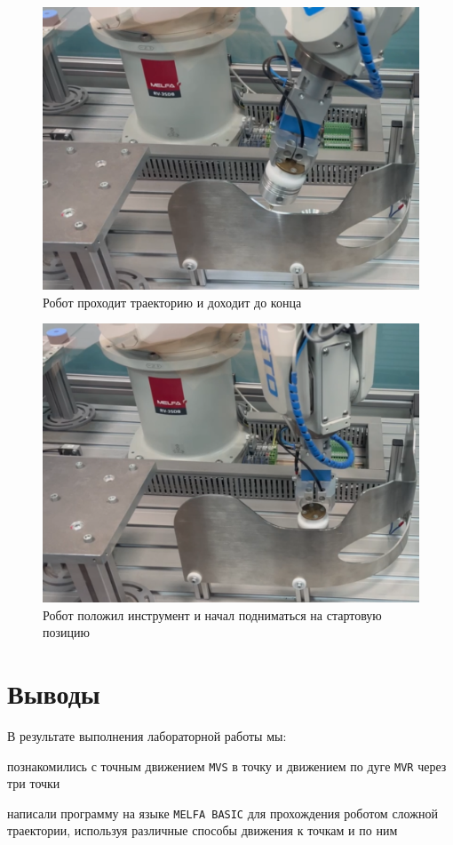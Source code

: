 \documentclass[a4paper, 12pt]{article}
\begin{document}
    \begin{figure}[H]
        \centering
        \includegraphics[scale=0.55]{scr3.png}
        \captionsetup{skip=0pt}
        \caption{Робот проходит траекторию и доходит до конца}
        \label{fig:scr3}
    \end{figure}
    \begin{figure}[H]
        \centering
        \includegraphics[scale=0.55]{end.png}
        \captionsetup{skip=0pt}
        \caption{Робот положил инструмент и начал подниматься на стартовую позицию}
        \label{fig:end}
    \end{figure}


    \newpage
    \section{Выводы}
    В результате выполнения лабораторной работы мы:
    \begin{compactitem}
        \item познакомились с точным движением \texttt{MVS} в точку и движением по дуге \texttt{MVR} через три точки
        \item написали программу на языке \texttt{MELFA BASIC} для прохождения роботом сложной траектории, используя различные способы движения к точкам и по ним
    \end{compactitem}
\end{document}
